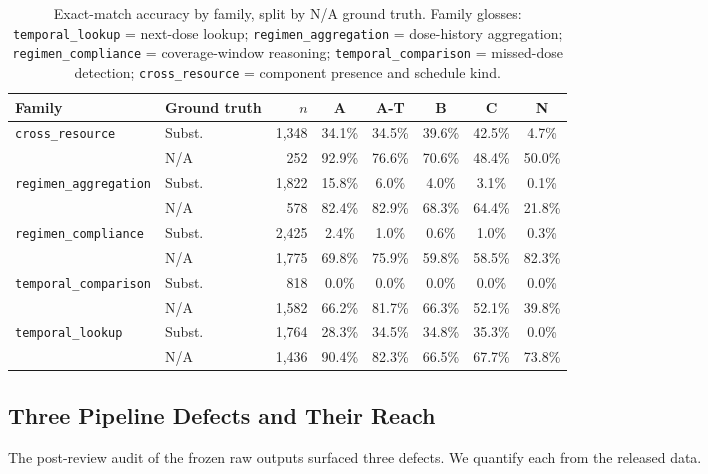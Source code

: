 \begin{table}[htbp]
\centering
\caption{Exact-match accuracy by family, split by N/A ground truth.  Family glosses:
\texttt{temporal\_lookup} = next-dose lookup; \texttt{regimen\_aggregation} = dose-history
aggregation; \texttt{regimen\_compliance} = coverage-window reasoning;
\texttt{temporal\_comparison} = missed-dose detection; \texttt{cross\_resource} =
component presence and schedule kind.}
\label{tab:family_results}
\footnotesize
\begin{tabular}{llrccccc}
\toprule
Family & Ground truth & $n$ & A & A-T & B & C & N \\
\midrule
\texttt{cross\_resource}      & Subst. & 1{,}348 & 34.1\% & 34.5\% & 39.6\% & 42.5\% & 4.7\% \\
                              & N/A    &   252   & 92.9\% & 76.6\% & 70.6\% & 48.4\% & 50.0\% \\
\texttt{regimen\_aggregation} & Subst. & 1{,}822 & 15.8\% & 6.0\%  & 4.0\%  & 3.1\%  & 0.1\% \\
                              & N/A    &   578   & 82.4\% & 82.9\% & 68.3\% & 64.4\% & 21.8\% \\
\texttt{regimen\_compliance}  & Subst. & 2{,}425 & 2.4\%  & 1.0\%  & 0.6\%  & 1.0\%  & 0.3\% \\
                              & N/A    & 1{,}775 & 69.8\% & 75.9\% & 59.8\% & 58.5\% & 82.3\% \\
\texttt{temporal\_comparison} & Subst. &   818   & 0.0\%  & 0.0\%  & 0.0\%  & 0.0\%  & 0.0\% \\
                              & N/A    & 1{,}582 & 66.2\% & 81.7\% & 66.3\% & 52.1\% & 39.8\% \\
\texttt{temporal\_lookup}     & Subst. & 1{,}764 & 28.3\% & 34.5\% & 34.8\% & 35.3\% & 0.0\% \\
                              & N/A    & 1{,}436 & 90.4\% & 82.3\% & 66.5\% & 67.7\% & 73.8\% \\
\bottomrule
\end{tabular}
\end{table}

\subsection{Three Pipeline Defects and Their Reach}
\label{sec:results:flaws}

The post-review audit of the frozen raw outputs surfaced three defects.  We quantify each
from the released data.

